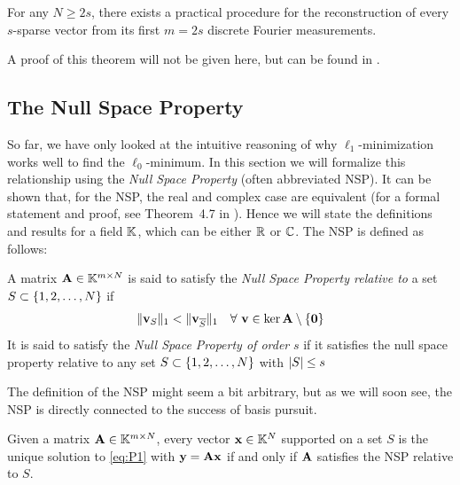 \begin{theorem}
	\label{thm:uniquesol_dft}
	For any $ N \geq 2s $, there exists a practical procedure for the reconstruction of every $ s $-sparse vector from its first $ m = 2s $ discrete Fourier measurements.
\end{theorem}

A proof of this theorem will not be given here, but can be found in \cite[Theorem~2.15]{foucart13intro}.




\subsection{The Null Space Property}
\label{sec:NSP}
So far, we have only looked at the intuitive reasoning of why $ \ell_{1} $-minimization works well to find the $ \ell_{0} $-minimum. In this section we will formalize this relationship using the \textit{Null Space Property} (often abbreviated NSP). It can be shown that, for the NSP, the real and complex case are equivalent (for a formal statement and proof, see Theorem~4.7 in \cite{foucart13intro}). Hence we will state the definitions and results for a field $ \mathbb{K} $, which can be either $ \mathbb{R} $ or $ \mathbb{C} $. The NSP is defined as follows:

\begin{definition} \label{def:NSP}
	A matrix $ \mathbf{A} \in \mathbb{K}^{m\times N} $ is said to satisfy the \textit{Null Space Property relative to} a set $ S \subset \{1, 2, \ldots, N\} $ if
	\[ 
		\lVert\mathbf{v}_S\rVert_1 < \lVert\mathbf{v}_{\overline{S}}\rVert_{1} \quad \forall ~ \mathbf{v} \in \ker \mathbf{A} \setminus \{\mathbf{0}\}
	\]
	It is said to satisfy the \textit{Null Space Property of order} $ s $ if it satisfies the null space property relative to any set $ S \subset \{1, 2, \ldots, N\} $ with $ \left|S\right| \leq s $
\end{definition}

The definition of the NSP might seem a bit arbitrary, but as we will soon see, the NSP is directly connected to the success of basis pursuit.

\begin{theorem}
	\label{thm:NSP_to_basis_special}
	Given a matrix $ \mathbf{A} \in \mathbb{K}^{m \times N} $, every vector $ \mathbf{x} \in \mathbb{K}^{N} $ supported on a set $ S $ is the unique solution to \eqref{eq:P1} with $ \mathbf{y} = \mathbf{A}\mathbf{x} $ if and only if $ \mathbf{A} $ satisfies the NSP relative to $ S $. 
\end{theorem}

